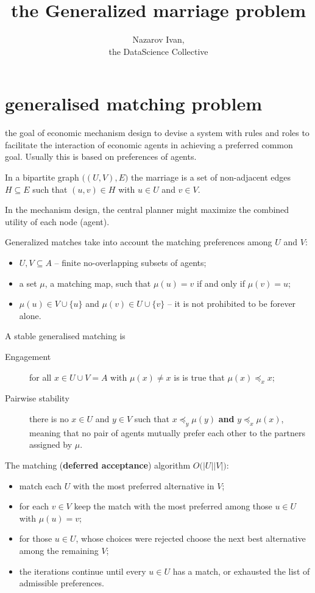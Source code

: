 \documentclass[a4paper]{article}
\title{the Generalized marriage problem}
\author{Nazarov Ivan, \rus{101мНОД(ИССА)}\\the DataScience Collective}
\begin{document}
\maketitle

\section{generalised matching problem} %
\label{sec:generalised_matching_problem}

the goal of economic mechanism design to devise a system with rules and roles
to facilitate the interaction of economic agents in achieving a preferred common goal.
Usually this is based on preferences of agents.

In a bipartite graph $\big((U, V), E\big)$ the marriage is a set of non-adjacent edges
$H\subseteq E$ such that $(u,v)\in H$ with $u\in U$ and $v\in V$.

In the mechanism design, the central planner might maximize the combined utility of each node (agent).

Generalized matches take into account the matching preferences among $U$ and $V$:
\begin{itemize}
	\item $U, V\subseteq A$ -- finite no-overlapping subsets of agents;
	\item a set $\mu$, a matching map, such that $\mu(u) = v$ if and only if $\mu(v)=u$;
	\item $\mu(u)\in V\cup \{u\}$ and $\mu(v)\in U\cup \{v\}$ -- it is not prohibited to be forever alone.
\end{itemize}

A stable generalised matching is 
\begin{description}
	\item[Engagement] for all $x\in U\cup V = A$ with $\mu(x) \neq x$ is is true that $\mu(x)\preceq_x x$;
	\item[Pairwise stability] there is no $x\in U$ and $y\in V$ such that $x\preceq_y \mu(y)$
	\textbf{and} $y\preceq_x \mu(x)$, meaning that no pair of agents mutually prefer each other
	to the partners assigned by $\mu$.
\end{description}

The matching (\textbf{deferred acceptance}) algorithm $O\big(|U||V|\big)$:
\begin{itemize}
	\item match each $U$ with the most preferred alternative in $V$;
	\item for each $v\in V$ keep the match with the most preferred among those $u\in U$ with $\mu(u)=v$;
	\item for those $u\in U$, whose choices were rejected choose the next best alternative among the remaining $V$;
	\item the iterations continue until every $u\in U$ has a match, or exhausted the list of admissible preferences.
\end{itemize}
\end{document}
